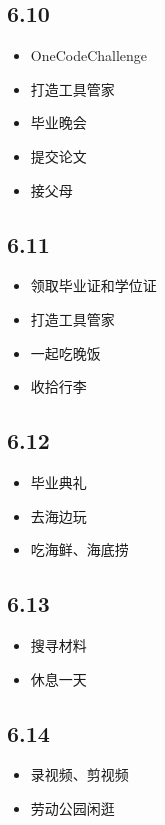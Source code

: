 \documentclass[UTF8]{ctexart}
\begin{document}
\subsection*{6.10}
\begin{itemize}
    \item OneCodeChallenge
    \item 打造工具管家
    \item 毕业晚会
    \item 提交论文
    \item 接父母
\end{itemize}

\subsection*{6.11}
\begin{itemize}
    \item 领取毕业证和学位证
    \item 打造工具管家
    \item 一起吃晚饭
    \item 收拾行李
\end{itemize}

\subsection*{6.12}
\begin{itemize}
    \item 毕业典礼
    \item 去海边玩
    \item 吃海鲜、海底捞
\end{itemize}

\subsection*{6.13}
\begin{itemize}
    \item 搜寻材料
    \item 休息一天
\end{itemize}

\subsection*{6.14}
\begin{itemize}
    \item 录视频、剪视频
    \item 劳动公园闲逛
\end{itemize}
\end{document}

